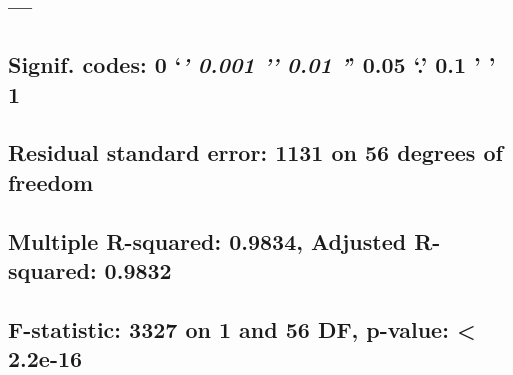 \documentclass[
  12pt,
]{article}
\begin{document}
\hypertarget{section-38}{%
\subsection{---}\label{section-38}}

\hypertarget{signif.-codes-0-0.001-0.01-0.05-.-0.1-1-3}{%
\subsection{\texorpdfstring{Signif. codes: 0 `\emph{\textbf{' 0.001 '}'
0.01 '}' 0.05 `.' 0.1 ' '
1}{Signif. codes: 0 `\,' 0.001 '\,' 0.01 '\,' 0.05 `.' 0.1 ' ' 1}}\label{signif.-codes-0-0.001-0.01-0.05-.-0.1-1-3}}

\hypertarget{section-39}{%
\subsection{}\label{section-39}}

\hypertarget{residual-standard-error-1131-on-56-degrees-of-freedom}{%
\subsection{Residual standard error: 1131 on 56 degrees of
freedom}\label{residual-standard-error-1131-on-56-degrees-of-freedom}}

\hypertarget{multiple-r-squared-0.9834-adjusted-r-squared-0.9832}{%
\subsection{Multiple R-squared: 0.9834, Adjusted R-squared:
0.9832}\label{multiple-r-squared-0.9834-adjusted-r-squared-0.9832}}

\hypertarget{f-statistic-3327-on-1-and-56-df-p-value-2.2e-16}{%
\subsection{F-statistic: 3327 on 1 and 56 DF, p-value: \textless{}
2.2e-16}\label{f-statistic-3327-on-1-and-56-df-p-value-2.2e-16}}

\begin{verbatim}
\end{verbatim}

\hypertarget{section-40}{%
\subsection{}\label{section-40}}
\end{document}
